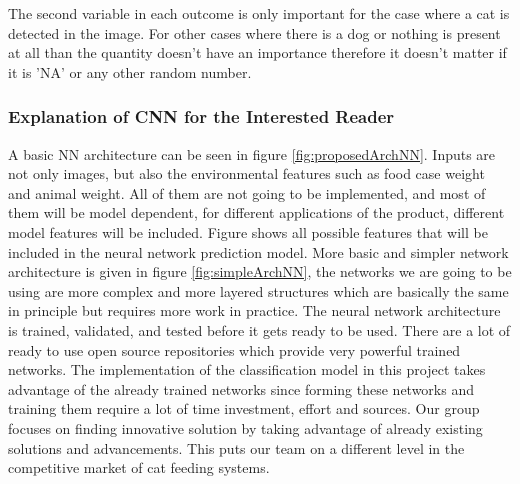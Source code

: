 The second variable in each outcome is only important for the case where a cat is detected in the image. For other cases where there is a dog or nothing is present at all than the quantity doesn't have an importance therefore it doesn't matter if it is 'NA' or any other random number. 


\subsubsection{Explanation of CNN for the Interested Reader}
    
A basic NN architecture can be seen in figure \ref{fig:proposedArchNN}. Inputs are not only images, but also the environmental features such as food case weight and animal weight. All of them are not going to be implemented, and most of them will be model dependent, for different applications of the product, different model features will be included. Figure shows all possible features that will be included in the neural network prediction model. More basic and simpler network architecture is given in figure \ref{fig:simpleArchNN}, the networks we are going to be using are more complex and more layered structures which are basically the same in principle but requires more work in practice. The neural network architecture is trained, validated, and tested before it gets ready to be used. There are a lot of ready to use open source repositories which provide very powerful trained networks. The implementation of the classification model in this project takes advantage of the already trained networks since forming these networks and training them require a lot of time investment, effort and sources. Our group focuses on finding innovative solution by taking advantage of already existing solutions and advancements. This puts our team on a different level in the competitive market of cat feeding systems.  


